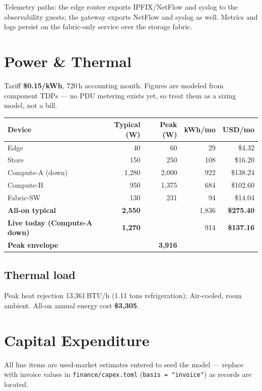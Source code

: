 \documentclass[11pt]{article}
\begin{document}
Telemetry paths: the edge router exports IPFIX/NetFlow and syslog to the
observability guests; the gateway exports NetFlow and syslog as well. Metrics
and logs persist on the fabric-only service over the storage fabric.


\section{Power \& Thermal}
Tariff \textbf{\$0.15/kWh}, 720\,h accounting month. Figures are modeled
from component TDPs — no PDU metering exists yet, so treat them as a sizing
model, not a bill.

\begin{tabularx}{\textwidth}{X r r r r}
\toprule
\textbf{Device} & \textbf{Typical (W)} & \textbf{Peak (W)} & \textbf{kWh/mo} & \textbf{USD/mo} \\
\midrule
Edge & 40 & 60 & 29 & \$4.32 \\
Store & 150 & 250 & 108 & \$16.20 \\
Compute-A \textcolor{accent}{(down)} & 1,280 & 2,000 & 922 & \$138.24 \\
Compute-B & 950 & 1,375 & 684 & \$102.60 \\
Fabric-SW & 130 & 231 & 94 & \$14.04 \\
\midrule
\textbf{All-on typical} & \textbf{2,550} & & 1,836 & \textbf{\$275.40} \\
\textbf{Live today (Compute-A down)} & \textbf{1,270} & & 914 & \textbf{\$137.16} \\
\textbf{Peak envelope} & & \textbf{3,916} & & \\
\bottomrule
\end{tabularx}

\subsection{Thermal load}
Peak heat rejection 13,361\,BTU/h (1.11 tons refrigeration);
Air-cooled, room ambient. All-on annual energy cost
\textbf{\$3,305}.


\section{Capital Expenditure}
\textcolor{accent}{All line items are used-market estimates} entered to
seed the model — replace with invoice values in \texttt{finance/capex.toml}
(\texttt{basis = "invoice"}) as records are located.
\end{document}
